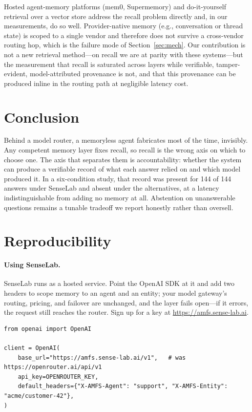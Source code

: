 \documentclass[11pt]{article}
\begin{document}
Hosted agent-memory platforms (mem0, Supermemory) and do-it-yourself retrieval over a vector
store address the recall problem directly and, in our measurements, do so well. Provider-native
memory (e.g., conversation or thread state) is scoped to a single vendor and therefore does
not survive a cross-vendor routing hop, which is the failure mode of
Section~\ref{sec:mech}. Our contribution is not a new retrieval method---on recall we are at
parity with these systems---but the measurement that recall is saturated across layers while
verifiable, tamper-evident, model-attributed provenance is not, and that this provenance can
be produced inline in the routing path at negligible latency cost.

\section{Conclusion}

Behind a model router, a memoryless agent fabricates most of the time, invisibly. Any
competent memory layer fixes recall, so recall is the wrong axis on which to choose one. The
axis that separates them is accountability: whether the system can produce a verifiable
record of what each answer relied on and which model produced it. In a six-condition study,
that record was present for 144 of 144 answers under SenseLab and absent under the alternatives,
at a latency indistinguishable from adding no memory at all. Abstention on unanswerable
questions remains a tunable tradeoff we report honestly rather than oversell.

\appendix
\section{Reproducibility}\label{app:repro}

\paragraph{Using SenseLab.} SenseLab runs as a hosted service. Point the OpenAI SDK at it and add
two headers to scope memory to an agent and an entity; your model gateway's routing, pricing, and
failover are unchanged, and the layer fails open---if it errors, the request still reaches the
router. Sign up for a key at \url{https://amfs.sense-lab.ai}.

\begin{lstlisting}[style=trace]
from openai import OpenAI

client = OpenAI(
    base_url="https://amfs.sense-lab.ai/v1",   # was https://openrouter.ai/api/v1
    api_key=OPENROUTER_KEY,
    default_headers={"X-AMFS-Agent": "support", "X-AMFS-Entity": "acme/customer-42"},
)
\end{lstlisting}
\end{document}
